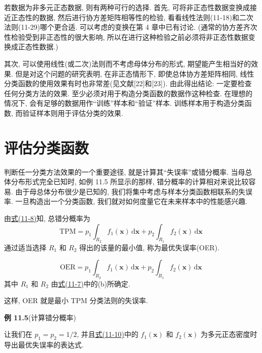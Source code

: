 
若数据为非多元正态数据, 则有两种可行的选择. 首先, 可将非正态性数据变换成接近正态性的数据, 然后进行协方差矩阵相等性的检验, 看看线性法则(11-18)和二次法则(11-29)哪个更合适. 可以考虑的变换在第 4 章中已有讨论. (通常的协方差齐次性检验受到非正态性的很大影响, 所以在进行这种检验之前必须将非正态性数据变换成正态性数据.)

其次, 可以使用线性(或二次)法则而不考虑母体分布的形式, 期望能产生相当好的效果. 但是对这个问题的研究表明, 在非正态情形下, 即使总体协方差矩阵相同, 线性分类函数的使用效果有时也非常差(见文献[22]和[23]). 由此得出结论: 一定要检查任何分类方法的效果. 至少必须对用于构造分类函数的数据作这种检查. 在理想的情况下, 会有足够的数据用作“训练”样本和“验证”样本. 训练样本用于构造分类函数, 而验证样本则用于评估分类的效果.

\section{评估分类函数}  %
\label{sec:11.4}

判断任一分类方法效果的一个重要途径, 就是计算其“失误率”或错分概率. 当母总体分布形式完全已知时, 如例 11.5 所显示的那样, 错分概率的计算相对来说比较容易. 由于母总体分布很少是已知的, 我们将集中考虑与样本分类函数相联系的失误率. 一旦构造出一个分类函数, 我们就对如何度量它在未来样本中的性能感兴趣.

由\hyperref[eq:11-8]{式(11-8)}知, 总错分概率为
\[
\mathrm{TPM}=p_1\int_{R_2}f_1(\mathbf{x})\,\mathrm{d}\mathbf{x}+p_2\int_{R_1}f_2(\mathbf{x})\,\mathrm{d}\mathbf{x}
\]
通过适当选择 $R_1$ 和 $R_2$ 得出的该量的最小值, 称为最优失误率(OER).

\begin{mvframe}[最优失误率]
\label{eq:11-30}
\begin{equation}
\mathrm{OER}=p_1\int_{R_2}f_1(\mathbf{x})\,\mathrm{d}\mathbf{x}+p_2\int_{R_1}f_2(\mathbf{x})\,\mathrm{d}\mathbf{x}
\tag{11-30}
\end{equation}
其中 $R_1$ 和 $R_2$ 由\hyperref[eq:11-7]{式(11-7)}中的(b)所确定.
\end{mvframe}

这样, OER 就是最小 TPM 分类法则的失误率.

\noindent\textbf{例 11.5}\quad (计算错分概率)

让我们在 $p_1=p_2=1/2$, 并且\hyperref[eq:11-10]{式(11-10)}中的 $f_1(\mathbf{x})$ 和 $f_2(\mathbf{x})$ 为多元正态密度时导出最优失误率的表达式.

